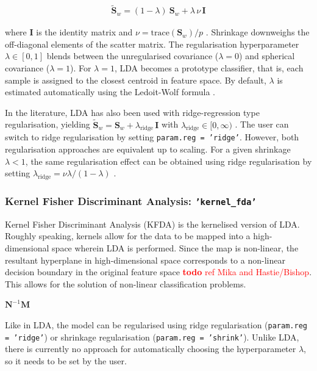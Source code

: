 \documentclass[utf8]{frontiersSCNS} %
\newcommand{\I}{\mathbf{I}}
\renewcommand{\S}{\mathbf{S}}
\newcommand{\ttt}[1]{\texttt{#1}}
\newcommand{\todo}[1]{\textcolor{red}{\textbf{todo} #1}}
\begin{document}
\begin{align}
\label{eq:shrinkage}
\widetilde{\S}_w = (1-\lambda)\ \S_w + \lambda\,\nu\,\I
\end{align}

where $\I$ is the identity matrix and $\nu = \text{trace}(\S_w)/p$ \citep{Blankertz2011}. Shrinkage downweighs the off-diagonal elements of the scatter matrix. The regularisation hyperparameter $\lambda\in [0,1]$ blends between the unregularised covariance ($\lambda=0$) and spherical covariance ($\lambda=1$). For $\lambda=1$, LDA becomes a prototype classifier, that is, each sample is assigned to the closest centroid in feature space. By default, $\lambda$ is estimated automatically using the Ledoit-Wolf formula \citep{Ledoit2003HoneyMatrix,Blankertz2011}.

In the literature, LDA has also been used with ridge-regression type regularisation, yielding $\widetilde{\S}_w = \S_w + \lambda_\text{ridge}\,\I$ with $\lambda_\text{ridge}\in [0,\infty)$ \citep{Friedman1989RegularizedAnalysis}. The user can switch to ridge regularisation by setting \ttt{param.reg = 'ridge'}. However, both regularisation approaches are equivalent up to scaling. For a given shrinkage $\lambda<1$, the same regularisation effect can be obtained using ridge regularisation by setting $\lambda_\text{ridge} = \nu\lambda / (1-\lambda)$
\citep{Treder2018Cross-validationLDA}.


\subsubsection{Kernel Fisher Discriminant Analysis: \ttt{'kernel\_fda'}}

Kernel Fisher Discriminant Analysis (KFDA) is the kernelised version of LDA. Roughly speaking, kernels allow for the data to be mapped into a high-dimensional space wherein LDA is performed. Since the map is non-linear, the resultant hyperplane in high-dimensional space corresponds to a non-linear decision boundary in the original feature space \todo{ref Mika and Hastie/Bishop}. This allows for the solution of non-linear classification problems.

$\mathbf{N}^{-1} \mathbf{M}$

Like in LDA, the model can be regularised using ridge regularisation (\ttt{param.reg = 'ridge'}) or shrinkage regularisation (\ttt{param.reg = 'shrink'}). Unlike LDA, there is currently no approach for automatically choosing the hyperparameter $\lambda$, so it needs to be set by the user.
\end{document}
